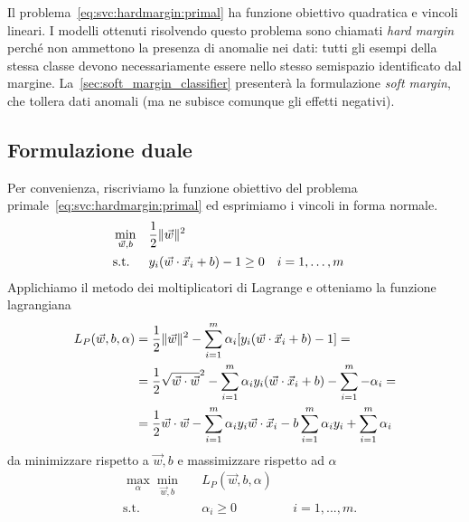%
Il problema~\cref{eq:svc:hardmargin:primal} ha funzione obiettivo quadratica e vincoli lineari. I modelli ottenuti risolvendo questo problema sono chiamati \emph{hard margin} perché non ammettono la presenza di anomalie nei dati: tutti gli esempi della stessa classe devono necessariamente essere nello stesso semispazio identificato dal margine. La~\cref{sec:soft_margin_classifier} presenterà la formulazione \emph{soft margin}, che tollera dati anomali (ma ne subisce comunque gli effetti negativi). 


\subsection{Formulazione duale}\label{subsec:hard_margin_dual}
Per convenienza, riscriviamo la funzione obiettivo del problema primale~\cref{eq:svc:hardmargin:primal} ed esprimiamo i vincoli in forma normale.
\begin{equation}\label{eq:svc:hardmargin:primal_convenient}
\begin{aligned}
& \min_{\Vec{w},b}    && \frac{1}{2}\|\Vec{w}\|^2 \\
& \textrm{s.t.} && y_i(\Vec{w}\cdot \Vec{x}_i + b) - 1 \geq 0 && i=1,\dots,m \\
\end{aligned}
\end{equation}
%
Applichiamo il metodo dei moltiplicatori di Lagrange e otteniamo la funzione lagrangiana
\begin{equation}
\label{eq:svc:hardmargin:lagrangian}
\begin{split}
L_P(\Vec{w},b, \alpha)  & = \frac{1}{2}\|\Vec{w}\|^2 - \sum_{i=1}^{m} \alpha_i [y_i(\Vec{w}\cdot \Vec{x}_i +b) -1] =\\
        & = \frac{1}{2}\sqrt{\Vec{w} \cdot \Vec{w}}^2 - \sum_{i=1}^{m} \alpha_i y_i(\Vec{w}\cdot \Vec{x}_i +b) -  \sum_{i=1}^{m} - \alpha_i = \\
        & = \frac{1}{2}\Vec{w}\cdot\Vec{w} - \sum_{i=1}^{m} \alpha_i y_i \Vec{w}\cdot \Vec{x}_i - b \sum_{i=1}^{m} \alpha_i y_i + \sum_{i=1}^{m} \alpha_i 
\end{split}
\end{equation}
da minimizzare rispetto a $\Vec{w},b$ e massimizzare rispetto ad $\alpha$ 
\begin{equation}
\label{eq:svc:hardmargin:max_min}
\begin{aligned}
& \max_{\alpha} \min_{\Vec{w}, b} && L_P(\Vec{w},b, \alpha) \\
& \textrm{s.t.} && \alpha_i \geq 0 && i=1,..., m.\\
\end{aligned}
\end{equation}

